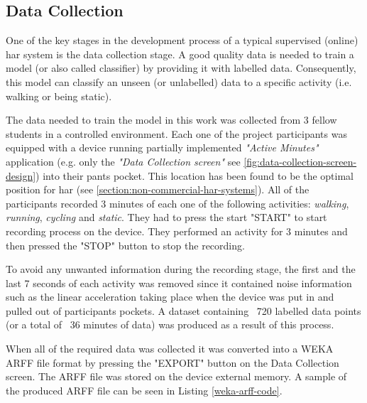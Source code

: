     \subsection{Data Collection}
    One of the key stages in the development process of a typical supervised (online) \gls{har} system is the data collection stage. A good quality data is needed to train a model (or also called classifier) by providing it with labelled data. Consequently, this model can classify an unseen (or unlabelled) data to a specific activity (i.e. walking or being static).
    
    The data needed to train the model in this work was collected from 3 fellow students in a controlled environment. Each one of the project participants was equipped with a device running partially implemented \textit{"Active Minutes"} application (e.g. only the \textit{"Data Collection screen"} see \ref{fig:data-collection-screen-design}) into their pants pocket. This location has been found to be the optimal position for \gls{har} (see \ref{section:non-commercial-har-systems}). All of the participants recorded 3 minutes of each one of the following activities: \textit{walking}, \textit{running}, \textit{cycling} and \textit{static}. They had to press the start "START" to start recording process on the device. They performed an activity for 3 minutes and then pressed the "STOP" button to stop the recording.
    
    To avoid any unwanted information during the recording stage, the first and the last 7 seconds of each activity was removed since it contained noise information such as the linear acceleration taking place when the device was put in and pulled out of participants pockets. A dataset containing ~720 labelled data points (or a total of ~36 minutes of data) was produced as a result of this process. 
    
    When all of the required data was collected it was converted into a WEKA ARFF file format by pressing the "EXPORT" button on the Data Collection screen. The ARFF file was stored on the device external memory. A sample of the produced ARFF file can be seen in Listing \ref{weka-arff-code}.
    
